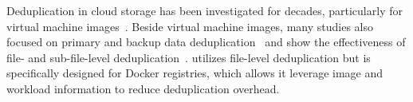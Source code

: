 %
%
%

Deduplication in cloud storage has been investigated for decades, particularly for virtual machine
images~\cite{zhou2013characterizing,srinivasan2012idedup,jin2009effectiveness, jayaram2011empirical}.
%
Beside virtual machine images, many studies also focused on primary and backup data
deduplication~\cite{tarasov2014dmdedup,muthitacharoen2001low,lu2012insights,2009-sparse_indexing_inline_dedup_using_sampling-fast,2013-charact_increment_changes_data_protect-atc,wallace2012characteristics,zhu2008avoiding, lillibridge2013improving,
fu2014accelerating,fu2015design,fu2011aa}
and show the effectiveness of file- and sub-file-level
deduplication~\cite{2012-hpc_practical_dedup_study-sc,msst16dedup-study}.
%
\sysname utilizes file-level deduplication but is specifically designed for Docker registries,
which allows it leverage image and workload information to reduce deduplication overhead.
%


